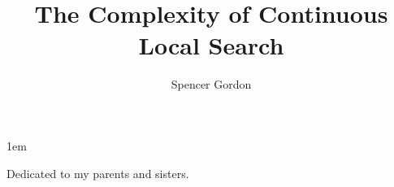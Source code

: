 \documentclass[draftthesis,tocnosub,noragright,centerchapter,12pt,mixcasechap]{uiucecethesis09}
\title{The Complexity of Continuous Local Search}
\author{Spencer Gordon}
\theoremstyle{plain}
\theoremstyle{definition}
\begin{document}
%
\maketitle

\parindent 1em%

\frontmatter

%
\begin{abstract}

\end{abstract}


%
\begin{dedication}
Dedicated to my parents and sisters.
\end{dedication}

%
\begin{acknowledgments}
\end{acknowledgments}

%
\tableofcontents

%



%
\end{document}
